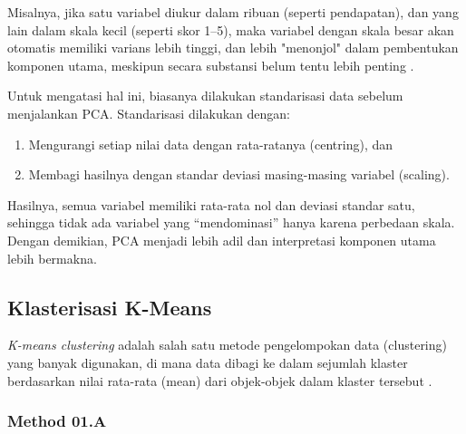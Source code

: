 \begin{itemize}
    Misalnya, jika satu variabel diukur dalam ribuan (seperti pendapatan), dan yang lain dalam skala kecil (seperti skor 1–5), maka variabel dengan skala besar akan otomatis memiliki varians lebih tinggi, dan lebih "menonjol" dalam pembentukan komponen utama, meskipun secara substansi belum tentu lebih penting \textcite{Jolliffe2016}.

    Untuk mengatasi hal ini, biasanya dilakukan standarisasi data sebelum menjalankan PCA. Standarisasi dilakukan dengan:
    \begin{enumerate}
        \item Mengurangi setiap nilai data dengan rata-ratanya (centring), dan
        \item Membagi hasilnya dengan standar deviasi masing-masing variabel (scaling).
    \end{enumerate}
    Hasilnya, semua variabel memiliki rata-rata nol dan deviasi standar satu, sehingga tidak ada variabel yang “mendominasi” hanya karena perbedaan skala. Dengan demikian, PCA menjadi lebih adil dan interpretasi komponen utama lebih bermakna.
\end{itemize}
\subsection{Klasterisasi K-Means}
\textit{K-means clustering} adalah salah satu metode pengelompokan data (clustering) yang banyak digunakan, di mana data dibagi ke dalam sejumlah klaster berdasarkan nilai rata-rata (mean) dari objek-objek dalam klaster tersebut \textcite{Ikotun2023}.

\subsubsection{Method 01.A}
\blindtext
